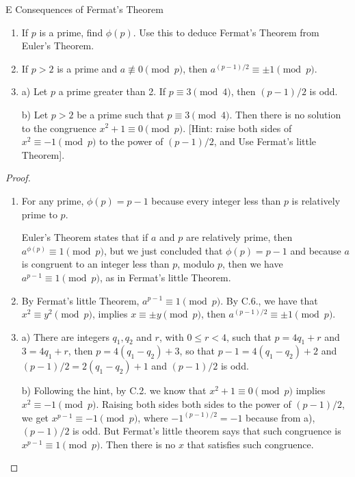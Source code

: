 \begin{exercise}{E Consequences of Fermat's Theorem}
\begin{enumerate}
    \item If $p$ is a prime, find $\phi(p)$. Use this to deduce Fermat's Theorem from Euler's Theorem.
    \item If $p>2$ is a prime and $a\not\equiv 0\pmod{p}$, then $a^{(p-1)/2}\equiv \pm 1\pmod{p}$.
    \item a) Let $p$ a prime greater than 2. If $p\equiv 3\pmod{4}$, then $(p-1)/2$ is odd.

    b) Let $p>2$ be a prime such that $p\equiv 3\pmod{4}$. Then there is no solution to the congruence $x^{2}+1\equiv 0\pmod{p}$. [Hint: raise both sides of $x^{2}\equiv -1\pmod{p}$ to the power of $(p-1)/2$, and Use Fermat's little Theorem].
    \end{enumerate}
\end{exercise}
\begin{proof}
 \begin{enumerate}
     \item For any prime, $\phi(p)=p-1$ because every integer less than $p$ is relatively prime to $p$.

     Euler's Theorem states that if $a$ and $p$ are relatively prime, then $a^{\phi(p)}\equiv 1\pmod{p}$, but we just concluded that $\phi(p)=p-1$ and because $a$ is congruent to an integer less than $p$, modulo $p$, then we have $a^{p-1}\equiv 1\pmod{p}$, as in Fermat's little Theorem.
     \item By Fermat's little Theorem, $a^{p-1}\equiv 1\pmod{p}$. By C.6., we have that $x^{2}\equiv y^{2}\pmod{p}$, implies $x\equiv \pm y\pmod{p}$, then $a^{(p-1)/2}\equiv \pm 1\pmod{p}$.
     \item a) There are integers $q_{1}, q_{2}$ and $r$, with $0\leq r< 4$, such that $p=4q_{1}+r$ and $3=4q_{1}+r$, then $p=4(q_{1}-q_{2})+3$, so that $p-1=4(q_{1}-q_{2})+2$ and $(p-1)/2=2(q_{1}-q_{2})+1$ and $(p-1)/2$ is odd.

     b) Following the hint, by C.2. we know that $x^{2}+1\equiv 0\pmod{p}$ implies $x^{2}\equiv -1\pmod{p}$. Raising both sides both sides to the power of $(p-1)/2$, we get $x^{p-1}\equiv -1 \pmod{p}$, where $-1^{(p-1)/2}=-1$ because from a), $(p-1)/2$ is odd. But Fermat's little theorem says that such congruence is $x^{p-1}\equiv 1\pmod{p}$. Then there is no $x$ that satisfies such congruence.
 \end{enumerate}
\end{proof}


